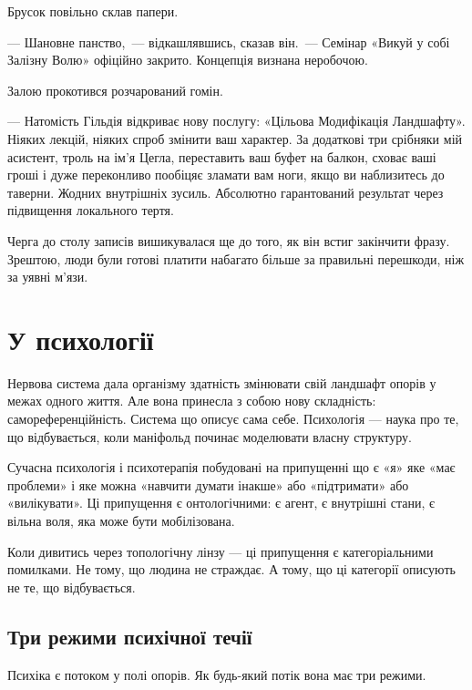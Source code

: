 \documentclass[12pt, a4paper, openany]{book}
\begin{document}
\begin{terrybox}
Брусок повільно склав папери.

--- Шановне панство,~--- відкашлявшись, сказав він.~--- Семінар «Викуй у собі Залізну Волю» офіційно закрито. Концепція визнана неробочою.

Залою прокотився розчарований гомін.

--- Натомість Гільдія відкриває нову послугу: «Цільова Модифікація Ландшафту». Ніяких лекцій, ніяких спроб змінити ваш характер. За додаткові три срібняки мій асистент, троль на ім'я Цегла, переставить ваш буфет на балкон, сховає ваші гроші і дуже переконливо пообіцяє зламати вам ноги, якщо ви наблизитесь до таверни. Жодних внутрішніх зусиль. Абсолютно гарантований результат через підвищення локального тертя.

Черга до столу записів вишикувалася ще до того, як він встиг закінчити фразу. Зрештою, люди були готові платити набагато більше за правильні перешкоди, ніж за уявні м'язи.
\end{terrybox}

\chapter{У психології}

Нервова система дала організму здатність змінювати свій ландшафт опорів у межах одного життя. Але вона принесла з собою нову складність: самореференційність. Система що описує сама себе. Психологія — наука про те, що відбувається, коли маніфольд починає моделювати власну структуру.

Сучасна психологія і психотерапія побудовані на припущенні що є «я» яке «має проблеми» і яке можна «навчити думати інакше» або «підтримати» або «вилікувати». Ці припущення є онтологічними: є агент, є внутрішні стани, є вільна воля, яка може бути мобілізована.

Коли дивитись через топологічну лінзу --- ці припущення є категоріальними помилками. Не тому, що людина не страждає. А тому, що ці категорії описують не те, що відбувається.

\section{Три режими психічної течії}

Психіка є потоком у полі опорів. Як будь-який потік вона має три режими.
\end{document}
